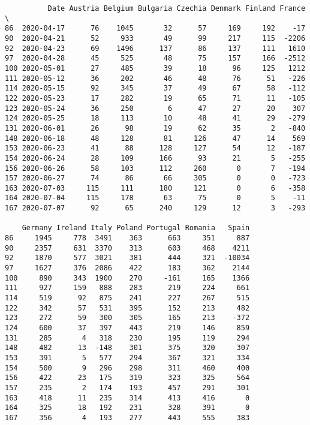 \documentclass[11pt]{article}
\begin{document}
    
    \begin{verbatim}
          Date Austria Belgium Bulgaria Czechia Denmark Finland France  \
86  2020-04-17      76    1045       32      57     169     192    -17   
90  2020-04-21      52     933       49      99     217     115  -2206   
92  2020-04-23      69    1496      137      86     137     111   1610   
97  2020-04-28      45     525       48      75     157     166  -2512   
100 2020-05-01      27     485       39      18      96     125   1212   
111 2020-05-12      36     202       46      48      76      51   -226   
114 2020-05-15      92     345       37      49      67      58   -112   
122 2020-05-23      17     282       19      65      71      11   -105   
123 2020-05-24      36     250        6      47      27      20    307   
124 2020-05-25      18     113       10      48      41      29   -279   
131 2020-06-01      26      98       19      62      35       2   -840   
148 2020-06-18      48     128       81     126      47      14    569   
153 2020-06-23      41      88      128     127      54      12   -187   
154 2020-06-24      28     109      166      93      21       5   -255   
156 2020-06-26      58     103      112     260       0       7   -194   
157 2020-06-27      74      86       66     305       0       0   -723   
163 2020-07-03     115     111      180     121       0       6   -358   
164 2020-07-04     115     178       63      75       0       5    -11   
167 2020-07-07      92      65      240     129      12       3   -293   

    Germany Ireland Italy Poland Portugal Romania   Spain  
86     1945     778  3491    363      663     351     887  
90     2357     631  3370    313      603     468    4211  
92     1870     577  3021    381      444     321  -10034  
97     1627     376  2086    422      183     362    2144  
100     890     343  1900    270     -161     165    1366  
111     927     159   888    283      219     224     661  
114     519      92   875    241      227     267     515  
122     342      57   531    395      152     213     482  
123     272      59   300    305      165     213    -372  
124     600      37   397    443      219     146     859  
131     285       4   318    230      195     119     294  
148     482      13  -148    301      375     320     307  
153     391       5   577    294      367     321     334  
154     500       9   296    298      311     460     400  
156     422      23   175    319      323     325     564  
157     235       2   174    193      457     291     301  
163     418      11   235    314      413     416       0  
164     325      18   192    231      328     391       0  
167     356       4   193    277      443     555     383  
    \end{verbatim}
\end{document}
